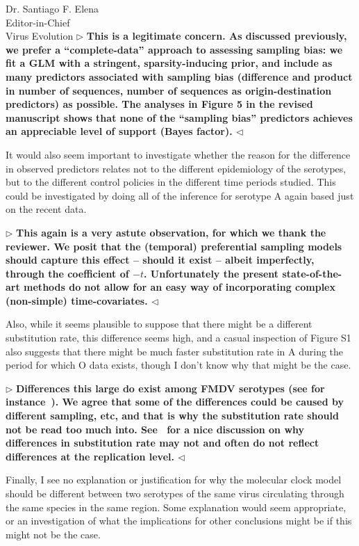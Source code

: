 \documentclass[12pt, a4paper]{letter} %
\newenvironment{reply}{$\triangleright$\bf}{$\triangleleft$}
\begin{document}
\begin{letter}{
	Dr. Santiago F. Elena\\
    Editor-in-Chief \\
    Virus Evolution
}
\begin{reply}
This is a legitimate concern. 
As discussed previously, we prefer a ``complete-data'' approach to assessing sampling bias: we fit a GLM with a stringent, sparsity-inducing prior, and include as many predictors associated with sampling bias (difference and product in number of sequences, number of sequences as origin-destination predictors) as possible.
The analyses in Figure 5 in the revised manuscript shows that none of the ``sampling bias'' predictors achieves an appreciable level of support (Bayes factor).
\end{reply}

It would also seem important to investigate whether the reason for the difference in observed predictors relates not to the different epidemiology of the serotypes, but to the different control policies in the different time periods studied. 
This could be investigated by doing all of the inference for serotype A again based just on the recent data.

\begin{reply}
This again is a very astute observation, for which we thank the reviewer.
We posit that the (temporal) preferential sampling models should capture this effect -- should it exist -- albeit imperfectly, through the coefficient of $-t$.
Unfortunately the present state-of-the-art methods do not allow for an easy way of incorporating complex (non-simple) time-covariates.
\end{reply}

Also, while it seems plausible to suppose that there might be a different substitution rate, this difference seems high, and a casual inspection of Figure S1 also suggests that there might be much faster substitution rate in A during the period for which O data exists, though I don't know why that might be the case.

\begin{reply}
Differences this large do exist among FMDV serotypes (see for instance~\cite{Tully2008}).
We agree that some of the differences could be caused by different sampling, etc, and that is why the substitution rate should not be read too much into.
See~\cite{Holmes2016} for a nice discussion on why differences in substitution rate may not and often do not reflect differences at the replication level.
\end{reply}

Finally, I see no explanation or justification for why the molecular clock model should be different between two serotypes of the same virus circulating through the same species in the same region. 
Some explanation would seem appropriate, or an investigation of what the implications for other conclusions might be if this might not be the case.


\end{letter}
\end{document}

